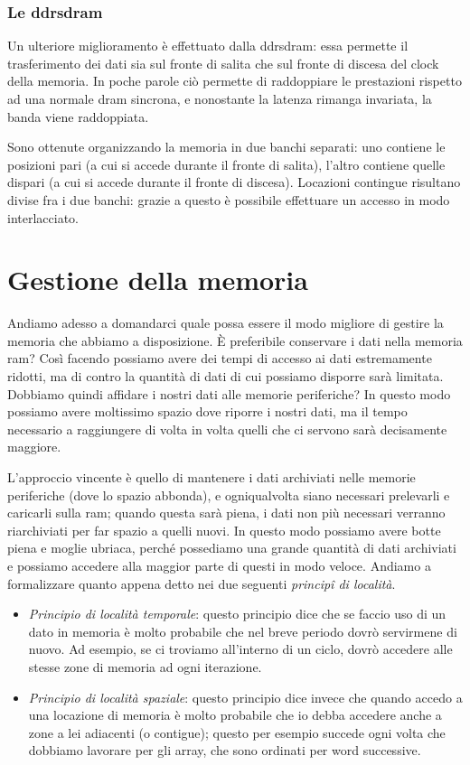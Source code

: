 \documentclass[class=book, crop=false, oneside]{standalone}
\begin{document}
\subsubsection{Le \acrfull{ddrsdram}}
Un ulteriore miglioramento è effettuato dalla \acrfull{ddrsdram}: essa permette il trasferimento dei dati sia sul fronte di salita che sul fronte di discesa del clock della memoria. In poche parole ciò permette di raddoppiare le prestazioni rispetto ad una normale \acrshort{dram} sincrona, e nonostante la latenza rimanga invariata, la banda viene raddoppiata.

Sono ottenute organizzando la memoria in due banchi separati: uno contiene le posizioni pari (a cui si accede durante il fronte di salita), l'altro contiene quelle dispari (a cui si accede durante il fronte di discesa). Locazioni contingue risultano divise fra i due banchi: grazie a questo è possibile effettuare un accesso in modo interlacciato.

\section{Gestione della memoria}
Andiamo adesso a domandarci quale possa essere il modo migliore di gestire la memoria che abbiamo a disposizione. È preferibile conservare i dati nella memoria \acrshort{ram}? Così facendo possiamo avere dei tempi di accesso ai dati estremamente ridotti, ma di contro la quantità di dati di cui possiamo disporre sarà limitata. Dobbiamo quindi affidare i nostri dati alle memorie periferiche? In questo modo possiamo avere moltissimo spazio dove riporre i nostri dati, ma il tempo necessario a raggiungere di volta in volta quelli che ci servono sarà decisamente maggiore.

L'approccio vincente è quello di mantenere i dati archiviati nelle memorie periferiche (dove lo spazio abbonda), e ogniqualvolta siano necessari prelevarli e caricarli sulla \acrshort{ram}; quando questa sarà piena, i dati non più necessari verranno riarchiviati per far spazio a quelli nuovi. In questo modo possiamo avere botte piena e moglie ubriaca, perché possediamo una grande quantità di dati archiviati e possiamo accedere alla maggior parte di questi in modo veloce. Andiamo a formalizzare quanto appena detto nei due seguenti \emph{principî di località}.
\begin{itemize}
	\item \emph{Principio di località temporale}: questo principio dice che se faccio uso di un dato in memoria è molto probabile che nel breve periodo dovrò servirmene di nuovo. Ad esempio, se ci troviamo all'interno di un ciclo, dovrò accedere alle stesse zone di memoria ad ogni iterazione.
	\item \emph{Principio di località spaziale}: questo principio dice invece che quando accedo a una locazione di memoria è molto probabile che io debba accedere anche a zone a lei adiacenti (o contigue); questo per esempio succede ogni volta che dobbiamo lavorare per gli array, che sono ordinati per word successive.
\end{itemize}
\end{document}
